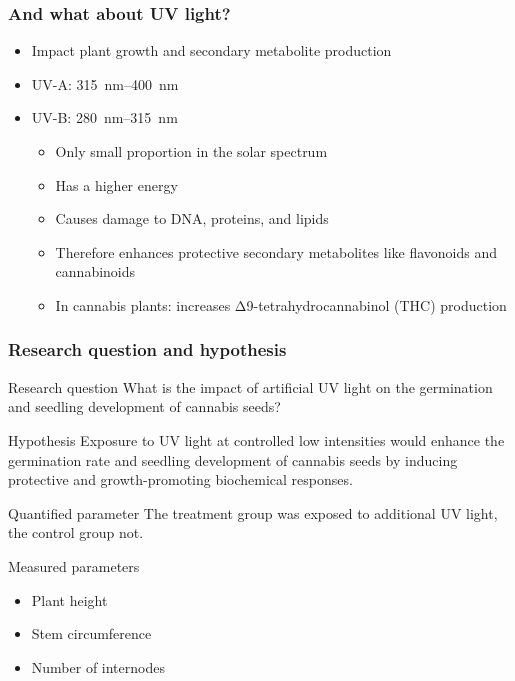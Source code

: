 \documentclass[
    12pt,
    aspectratio=1610,
    bibliography=../bibliography.bib,
    link-citations]{beamer}
\begin{document}
    \begin{frame}
        \frametitle{And what about UV light?}
        \begin{itemize}
            \item Impact plant growth and secondary metabolite production
            \item UV-A: \qtyrange[mode=text, range-phrase=\textendash, range-units=single]{315}{400}{\nm}
            \item UV-B: \qtyrange[mode=text, range-phrase=\textendash, range-units=single]{280}{315}{\nm}
            \begin{itemize}
                \item Only small proportion in the solar spectrum
                \item Has a higher energy
                \item Causes damage to DNA, proteins, and lipids
                \item Therefore enhances protective secondary metabolites like flavonoids and cannabinoids
                \item In cannabis plants: increases Δ9-tetrahydrocannabinol (THC) production
            \end{itemize}
        \end{itemize}
        \quad \autocite{eichhorn_bilodeau_update_2019, international_organization_for_standardization_space_2007, lydon_uv-b_1987}
    \end{frame}

    \begin{frame}
        \frametitle{Research question and hypothesis}
        \begin{footnotesize}
            \begin{block}{Research question}
                What is the impact of artificial UV light on the germination and seedling development of cannabis seeds?
            \end{block}
            \begin{block}{Hypothesis}
                Exposure to UV light at controlled low intensities would enhance the germination rate and seedling development of cannabis seeds by inducing protective and growth-promoting biochemical responses.
            \end{block}
            \begin{block}{Quantified parameter}
                The treatment group was exposed to additional UV light, the control group not.
            \end{block}
            \begin{block}{Measured parameters}
                \begin{itemize}
                    \item Plant height
                    \item Stem circumference
                    \item Number of internodes
                \end{itemize}
            \end{block}
        \end{footnotesize}
    \end{frame}
\end{document}

